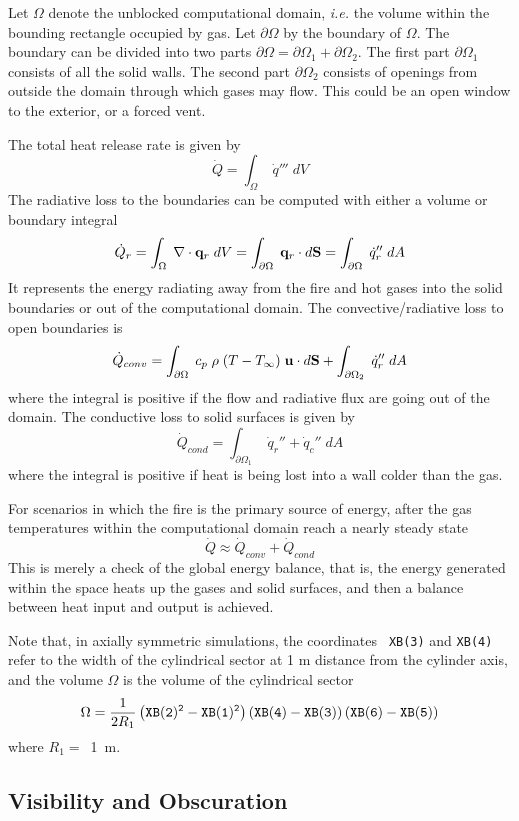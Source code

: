 \documentclass[11pt]{book}
\newcommand{\ct}{\tt\small}
\newcommand{\dS}{{d\bf S}}
\newcommand{\dA}{{dA}}
\newcommand{\bq}{{\bf q}}
\newcommand{\bu}{{\bf u}}
\newcommand{\dq}{\dot{q}}
\newcommand{\be}{\begin{equation}}
\newcommand{\ee}{\end{equation}}
\begin{document}
Let $\Omega$ denote the unblocked computational domain, {\em i.e.} the
volume within the bounding rectangle occupied by gas. Let $\partial
\Omega$ by the boundary of $\Omega$. The boundary can be divided into
two parts $\partial \Omega = \partial \Omega_1 + \partial
\Omega_2$. The first part $\partial \Omega_1$ consists of all the
solid walls. The second part $\partial \Omega_2$ consists of openings
from outside the domain through which gases may flow. This could be an
open window to the exterior, or a forced vent.

The total heat release rate is given by
\be \dot{Q} = \int_\Omega \; \dq''' \; dV \ee
The radiative loss to the
boundaries can be computed with either a volume or boundary integral
\be \dot{Q}_r = \int_\Omega \; \nabla \cdot \bq_r \; dV =
\int_{\partial \Omega} \; \bq_r \cdot \dS = \int_{\partial \Omega} \; \dq_r'' \; \dA \ee
It represents the energy radiating away from the fire and hot gases into
the solid boundaries or out of the computational domain. The convective/radiative
loss to open boundaries is
\be \dot{Q}_{conv} =  \int_{\partial \Omega} \; c_p \; \rho \; (T-T_\infty) \; \bu \cdot \dS
   + \int_{\partial \Omega_2} \; \dq_r'' \; \dA  \ee
where the integral is positive if the flow and radiative flux are going out of the domain.
The conductive loss to solid surfaces is given by
\be \dot{Q}_{cond} = \int_{\partial \Omega_1} \; \dq_r'' + \dq_c'' \; \dA  \ee
where the integral is positive if heat is being lost into a wall colder
than the gas.

For scenarios in which the fire is the primary source of energy, after
the gas temperatures within the computational domain reach a nearly
steady state
\be \dot{Q} \approx \dot{Q}_{conv} + \dot{Q}_{cond}  \ee
This is merely a check of the global energy balance, that is, the
energy generated within the space heats up the gases and solid
surfaces, and then a balance between heat input and output is
achieved.

Note that, in axially symmetric simulations, the coordinates {\ct
XB(3)} and {\ct XB(4)} refer to the width of the cylindrical sector
at 1 m distance from the cylinder axis, and the volume $\Omega$ is
the volume of the cylindrical sector
\be
\Omega = \frac{1}{2 R_1}\left({\ct XB(2)^2-XB(1)^2}\right)
            \left({\ct XB(4)-XB(3)}\right)
            \left({\ct XB(6)-XB(5)}\right)
\ee
where $R_1 = $~1~m.


\subsection{Visibility and Obscuration}
\label{info:visibility}
\label{info:obscuration}
\end{document}
